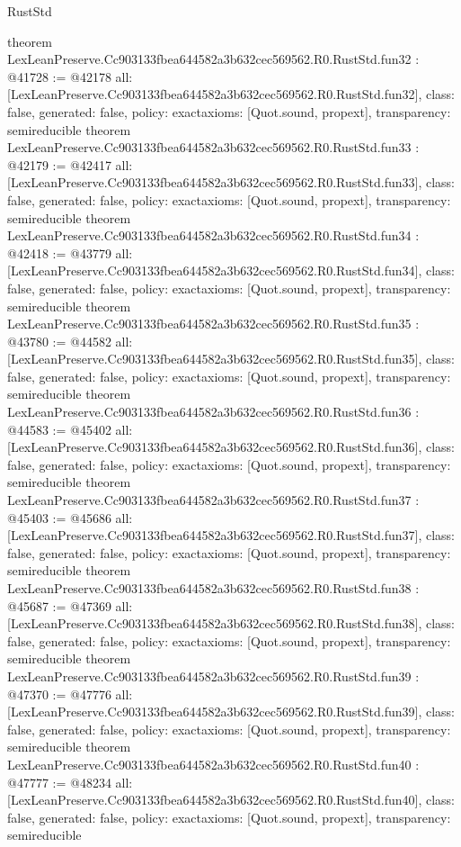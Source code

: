 \begin{lexlean}{RustStd}
\begin{coremodule}
{}
theorem LexLeanPreserve.Cc903133fbea644582a3b632cec569562.R0.RustStd.fun32 : @41728 := @42178 {
  all: [LexLeanPreserve.Cc903133fbea644582a3b632cec569562.R0.RustStd.fun32],
  class: false,
  generated: false,
  policy: exact{axioms: [Quot.sound, propext]},
  transparency: semireducible
}
theorem LexLeanPreserve.Cc903133fbea644582a3b632cec569562.R0.RustStd.fun33 : @42179 := @42417 {
  all: [LexLeanPreserve.Cc903133fbea644582a3b632cec569562.R0.RustStd.fun33],
  class: false,
  generated: false,
  policy: exact{axioms: [Quot.sound, propext]},
  transparency: semireducible
}
theorem LexLeanPreserve.Cc903133fbea644582a3b632cec569562.R0.RustStd.fun34 : @42418 := @43779 {
  all: [LexLeanPreserve.Cc903133fbea644582a3b632cec569562.R0.RustStd.fun34],
  class: false,
  generated: false,
  policy: exact{axioms: [Quot.sound, propext]},
  transparency: semireducible
}
theorem LexLeanPreserve.Cc903133fbea644582a3b632cec569562.R0.RustStd.fun35 : @43780 := @44582 {
  all: [LexLeanPreserve.Cc903133fbea644582a3b632cec569562.R0.RustStd.fun35],
  class: false,
  generated: false,
  policy: exact{axioms: [Quot.sound, propext]},
  transparency: semireducible
}
theorem LexLeanPreserve.Cc903133fbea644582a3b632cec569562.R0.RustStd.fun36 : @44583 := @45402 {
  all: [LexLeanPreserve.Cc903133fbea644582a3b632cec569562.R0.RustStd.fun36],
  class: false,
  generated: false,
  policy: exact{axioms: [Quot.sound, propext]},
  transparency: semireducible
}
theorem LexLeanPreserve.Cc903133fbea644582a3b632cec569562.R0.RustStd.fun37 : @45403 := @45686 {
  all: [LexLeanPreserve.Cc903133fbea644582a3b632cec569562.R0.RustStd.fun37],
  class: false,
  generated: false,
  policy: exact{axioms: [Quot.sound, propext]},
  transparency: semireducible
}
theorem LexLeanPreserve.Cc903133fbea644582a3b632cec569562.R0.RustStd.fun38 : @45687 := @47369 {
  all: [LexLeanPreserve.Cc903133fbea644582a3b632cec569562.R0.RustStd.fun38],
  class: false,
  generated: false,
  policy: exact{axioms: [Quot.sound, propext]},
  transparency: semireducible
}
theorem LexLeanPreserve.Cc903133fbea644582a3b632cec569562.R0.RustStd.fun39 : @47370 := @47776 {
  all: [LexLeanPreserve.Cc903133fbea644582a3b632cec569562.R0.RustStd.fun39],
  class: false,
  generated: false,
  policy: exact{axioms: [Quot.sound, propext]},
  transparency: semireducible
}
theorem LexLeanPreserve.Cc903133fbea644582a3b632cec569562.R0.RustStd.fun40 : @47777 := @48234 {
  all: [LexLeanPreserve.Cc903133fbea644582a3b632cec569562.R0.RustStd.fun40],
  class: false,
  generated: false,
  policy: exact{axioms: [Quot.sound, propext]},
  transparency: semireducible
}
\end{coremodule}
\end{lexlean}
